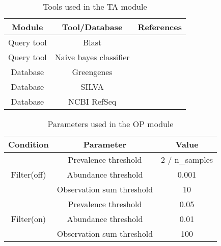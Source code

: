   \begin{table}[h]
    \centering
    \small
    \begin{tabular}{|c|c|c|}
      \hline
      \textbf{Module} & \textbf{Tool/Database} & \textbf{References} \\
      \hline
      Query tool & Blast & \cite{camachoBLASTArchitectureApplications2009,bokulichOptimizingTaxonomicClassification2018} \\
      Query tool & Naive bayes classifier & \cite{bokulichOptimizingTaxonomicClassification2018} \\
      \hline
      Database & Greengenes & \cite{DeSantis2006} \\
      Database & SILVA & \cite{Quast2012} \\
      Database & NCBI RefSeq & \cite{Sayers2009} \\
      \hline
    \end{tabular}
    \caption{Tools used in the TA module}
    \label{tab:ta_tools}
  \end{table}

  \begin{table}[h]
    \centering
    \small
    \begin{tabular}{|c|c|c|}
    \hline
    Condition                    & Parameter                 & Value          \\ \hline
    \multirow{3}{*}{Filter(off)} & Prevalence threshold      & 2 / n\_samples \\ \cline{2-3}
                                 & Abundance threshold       & 0.001          \\ \cline{2-3}
                                 & Observation sum threshold & 10             \\ \hline
    \multirow{3}{*}{Filter(on)}  & Prevalence threshold      & 0.05           \\ \cline{2-3}
                                 & Abundance threshold       & 0.01           \\ \cline{2-3}
                                 & Observation sum threshold & 100            \\ \hline
    \end{tabular}
    \caption{Parameters used in the OP module}
    \label{tab:ni_tools}
  \end{table}

